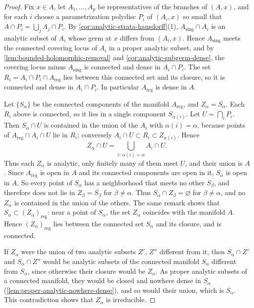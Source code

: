 \begin{proof}
Fix $x\in A$, let $A_1,\ldots,A_p$ be representatives of the branches of $(A,x)$, and for each $i$ choose a parametrization polydisc $P_i$ of $(A_i,x)$ so small that $A\cap P_i=\bigcup_j A_j\cap P_i$. By \cref{cor:analytic-strata-hausdorff}(1), $A_{\mathrm{sing}}\cap A_i$ is an analytic subset of $A_i$ whose germ at $x$ differs from $(A_i,x)$. Hence $A_{\mathrm{sing}}$ meets the connected covering locus of $A_i$ in a proper analytic subset, and by \cref{lem:bounded-holomorphic-removal} and \cref{cor:analytic-subgerm-dense}, the covering locus minus $A_{\mathrm{sing}}$ is connected and dense in $A_i\cap P_i$. The set $R_i=A_i\cap P_i\cap A_{\mathrm{reg}}$ lies between this connected set and its closure, so it is connected and dense in $A_i\cap P_i$. In particular $A_{\mathrm{reg}}$ is dense in $A$.

Let $\{S_\alpha\}$ be the connected components of the manifold $A_{\mathrm{reg}}$, and $Z_\alpha=\overline{S_\alpha}$. Each $R_i$ above is connected, so it lies in a single component $S_{\alpha(i)}$. Let $U=\bigcap_iP_i$. Then $S_\alpha\cap U$ is contained in the union of the $A_i$ with $\alpha(i)=\alpha$, because points of $A_{\mathrm{reg}}\cap A_i\cap U$ lie in $R_i$; conversely $A_i\cap U\subset\overline{R_i}\subset Z_{\alpha(i)}$. Hence
\[
 Z_\alpha\cap U=\bigcup_{i:\,\alpha(i)=\alpha}A_i\cap U.
\]
Thus each $Z_\alpha$ is analytic, only finitely many of them meet $U$, and their union is $A$. Since $A_{\mathrm{reg}}$ is open in $A$ and its connected components are open in it, $S_\alpha$ is open in $A$. So every point of $S_\alpha$ has a neighborhood that meets no other $S_\beta$, and therefore does not lie in $Z_\beta=\overline{S_\beta}$ for $\beta\neq\alpha$. Thus $S_\alpha\cap Z_\beta=\varnothing$ for $\beta\neq\alpha$, and no $Z_\alpha$ is contained in the union of the others. The same remark shows that $S_\alpha\subset(Z_\alpha)_{\mathrm{reg}}$: near a point of $S_\alpha$, the set $Z_\alpha$ coincides with the manifold $A$. Hence $(Z_\alpha)_{\mathrm{reg}}$ lies between the connected set $S_\alpha$ and its closure, and is connected.

If $Z_\alpha$ were the union of two analytic subsets $Z'$, $Z''$ different from it, then $S_\alpha\cap Z'$ and $S_\alpha\cap Z''$ would be analytic subsets of the connected manifold $S_\alpha$ different from $S_\alpha$, since otherwise their closure would be $Z_\alpha$. As proper analytic subsets of a connected manifold, they would be closed and nowhere dense in $S_\alpha$ (\cref{lem:proper-analytic-nowhere-dense}), and so would their union, which is $S_\alpha$. This contradiction shows that $Z_\alpha$ is irreducible.


\end{proof}

